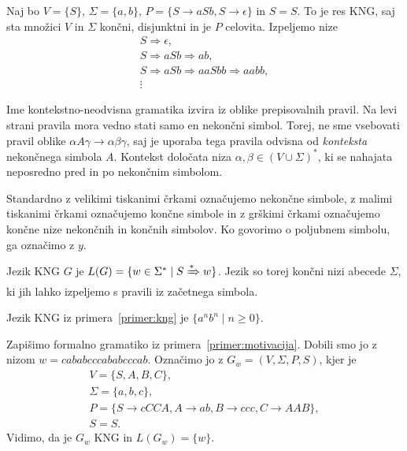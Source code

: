 \documentclass[fin1, tisk]{fmfdelo}
\theoremstyle{definition}
\begin{document}
\begin{primer}
    Naj bo $ V = \{ S\}$, 
    $\Sigma = \{ a,b \}$, 
    $P = \{ S \rightarrow \mathit{aSb}, S \rightarrow \epsilon \}$ in
    $S = S$.
    To je res KNG, saj sta množici $V$ in $\Sigma$ končni, disjunktni in je $P$ celovita.
    Izpeljemo nize
    \begin{gather*}
        S \Rightarrow \epsilon, \\
        S \Rightarrow \mathit{aSb} \Rightarrow \mathit{ab}, \\
        S \Rightarrow \mathit{aSb} \Rightarrow \mathit{aaSbb} \Rightarrow \mathit{aabb}, \\
        \vdots
    \end{gather*}
\end{primer}

Ime kontekstno-neodvisna gramatika izvira iz oblike prepisovalnih pravil. Na levi strani 
pravila mora vedno stati samo en nekončni simbol. Torej, ne sme vsebovati pravil oblike 
$\alpha A \gamma \rightarrow \alpha\beta\gamma$, saj je uporaba tega pravila odvisna od 
\emph{konteksta} nekončnega simbola $A$. Kontekst določata niza 
$\alpha, \beta \in ( V \cup \Sigma )^*$, ki se nahajata neposredno pred in po nekončnim simbolom.

Standardno z velikimi tiskanimi črkami označujemo nekončne simbole, z malimi tiskanimi črkami 
označujemo končne simbole in z grškimi črkami označujemo končne nize nekončnih in končnih simbolov.
Ko govorimo o poljubnem simbolu, ga označimo z $y$.

\begin{definicija}\label{primer:kng}
    Jezik KNG $G$ je $L(G) = \{ w \in \Sigma^* \mid S \xRightarrow{*} w \}$. Jezik so torej
    končni nizi abecede $\Sigma$, ki jih lahko izpeljemo s pravili iz začetnega simbola.
\end{definicija}

\begin{primer}
    Jezik KNG iz primera~\ref{primer:kng} je $\{ a^n b^n \mid n \geq 0 \}$.
\end{primer}

\begin{primer}
    Zapišimo formalno gramatiko iz primera~\ref{primer:motivacija}. Dobili smo jo z nizom
    $w = \mathit{cababcccababcccab} $. Označimo jo z $ G_w = (V, \Sigma, P, S) $, kjer je 
    \begin{gather*}
        V = \{ S, A, B, C \}, \\
        \Sigma = \{ a, b, c \}, \\
        P = \{ S \rightarrow \mathit{cCCA}, A \rightarrow \mathit{ab}, B 
        \rightarrow \mathit{ccc}, C \rightarrow \mathit{AAB} \}, \\
        S = S.
    \end{gather*}
    Vidimo, da je $G_w$ KNG in $ L(G_w) = \{w\} $.
\end{primer}
\end{document}
